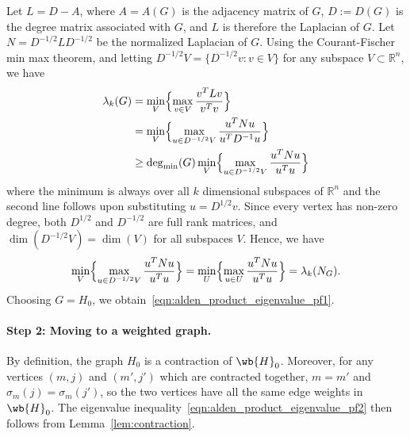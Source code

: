 \documentclass{article}
\newcommand{\Reals}{\mathbb{R}}
\newcommand{\1}{\mathbf{1}}
\theoremstyle{alden}
\theoremstyle{aldenthm}
\theoremstyle{definition}
\theoremstyle{remark}
\begin{document}
Let $L = D - A$, where $A = A(G)$ is the adjacency matrix of $G$, $D := D(G)$ is the degree matrix associated with $G$, and $L$ is therefore the Laplacian of $G$. Let $N = D^{-1/2} L D^{-1/2}$ be the normalized Laplacian of $G$. Using the Courant-Fischer min max theorem, and letting $D^{-1/2} V = \{D^{-1/2} v: v\in V\}$ for any subspace $V \subset \Reals^n$, we have
\begin{align*}
\lambda_k(G) & = \min_{V} \Bigl\{ \max_{v \in V} \frac{v^T L v}{v^T v} \Bigr\} \\
& = \min_{V} \Bigl\{ \max_{u \in D^{-1/2} V} \frac{u^T N u}{u^T D^{-1} u} \Bigr\} \\
& \geq \deg_{\min}(G) \min_{V} \Bigl\{ \max_{u \in D^{-1/2} V} \frac{u^T N u}{u^T u} \Bigr\}
\end{align*}
where the minimum is always over all $k$ dimensional subspaces of $\Reals^n$ and the second line follows upon substituting $u = D^{1/2} v$. Since every vertex has non-zero degree, both $D^{1/2}$ and $D^{-1/2}$ are full rank matrices, and $\dim(D^{-1/2} V) = \dim(V)$ for all subspaces $V$. Hence, we have
\begin{equation*}
\min_{V} \Bigl\{ \max_{u \in D^{-1/2} V} \frac{u^T N u}{u^T u} \Bigr\} = \min_{U} \Bigl\{ \max_{u \in U} \frac{u^T N u}{u^T u} \Bigr\} = \lambda_k(N_G).
\end{equation*} 
Choosing $G = H_0$, we obtain~\eqref{eqn:alden_product_eigenvalue_pf1}.

\paragraph{Step 2: Moving to a weighted graph.}

By definition, the graph $H_0$ is a contraction of $\wb{H}_0$. Moreover, for any vertices $(m,j)$ and $(m',j')$ which are contracted together, $m = m'$ and $\sigma_m(j) = \sigma_m(j')$, so the two vertices have all the same edge weights in $\wb{H}_0$. The eigenvalue inequality~\eqref{eqn:alden_product_eigenvalue_pf2} then follows from Lemma~\ref{lem:contraction}.
\end{document}
